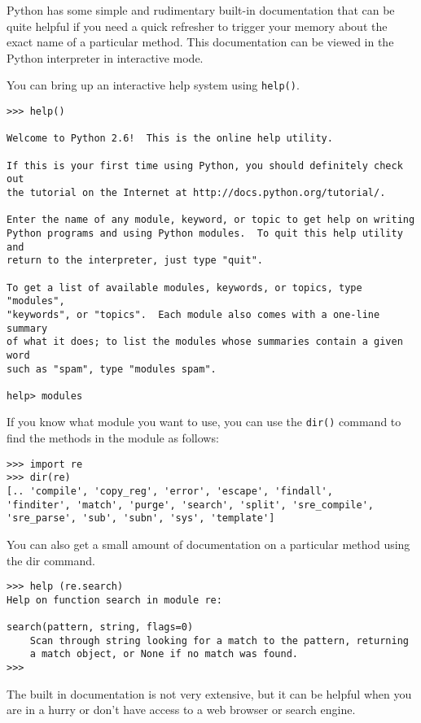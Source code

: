 Python has some simple and rudimentary built-in documentation that can be quite helpful if you need a quick refresher to trigger your memory about the exact name of a particular method.   This documentation can be viewed in the Python interpreter in interactive mode.

You can bring up an interactive help system using {\tt help()}.

\beforeverb
\begin{verbatim}
>>> help()

Welcome to Python 2.6!  This is the online help utility.

If this is your first time using Python, you should definitely check out
the tutorial on the Internet at http://docs.python.org/tutorial/.

Enter the name of any module, keyword, or topic to get help on writing
Python programs and using Python modules.  To quit this help utility and
return to the interpreter, just type "quit".

To get a list of available modules, keywords, or topics, type "modules",
"keywords", or "topics".  Each module also comes with a one-line summary
of what it does; to list the modules whose summaries contain a given word
such as "spam", type "modules spam".

help> modules
\end{verbatim}
\afterverb
%
If you know what module you want to use, you can use the {\tt dir()} command to find the methods in the module as follows:

\beforeverb
\begin{verbatim}
>>> import re
>>> dir(re)
[.. 'compile', 'copy_reg', 'error', 'escape', 'findall', 
'finditer', 'match', 'purge', 'search', 'split', 'sre_compile', 
'sre_parse', 'sub', 'subn', 'sys', 'template']
\end{verbatim}
\afterverb
%
You can also get a small amount of documentation on a particular method using the dir command.

\beforeverb
\begin{verbatim}
>>> help (re.search)
Help on function search in module re:

search(pattern, string, flags=0)
    Scan through string looking for a match to the pattern, returning
    a match object, or None if no match was found.
>>> 
\end{verbatim}
\afterverb
%
The built in documentation is not very extensive, but it can be helpful when you are in a hurry
or don't have access to a web browser or search engine.

